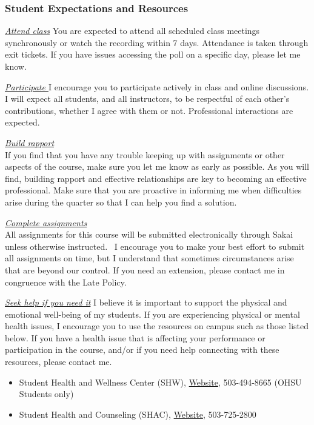 \documentclass[
  letterpaper,
  DIV=11,
  numbers=noendperiod]{scrartcl}
\begin{document}
\subsubsection{Student Expectations and
Resources}\label{student-expectations-and-resources}

\ul{\emph{Attend class}}\textbf{\hfill\break
}You are expected to attend all scheduled class meetings synchronously
or watch the recording within 7 days. Attendance is taken through exit
tickets. If you have issues accessing the poll on a specific day, please
let me know.~

\ul{\emph{Participate\textbf{\hfill\break
}}}I encourage you to participate actively in class and online
discussions. I will expect all students, and all instructors, to be
respectful of each other's contributions, whether I agree with them or
not. Professional interactions are expected.

\ul{\emph{Build rapport}}\\
If you find that you have any trouble keeping up with assignments or
other aspects of the course, make sure you let me know as early as
possible. As you will find, building rapport and effective relationships
are key to becoming an effective professional. Make sure that you are
proactive in informing me when difficulties arise during the quarter so
that I can help you find a solution.

\ul{\emph{Complete assignments}}\\
All assignments for this course will be submitted electronically through
Sakai unless otherwise instructed.~ I encourage you to make your best
effort to submit all assignments on time, but I understand that
sometimes circumstances arise that are beyond our control. If you need
an extension, please contact me in congruence with the Late Policy.

\ul{\emph{Seek help if you need it}}\textbf{\hfill\break
}I believe it is important to support the physical and emotional
well‐being of my students. If you are experiencing physical or mental
health issues, I encourage you to use the resources on campus such as
those listed below. If you have a health issue that is affecting your
performance or participation in the course, and/or if you need help
connecting with these resources, please contact me.

\begin{itemize}
\item
  Student Health and Wellness Center (SHW),
  \href{https://www.ohsu.edu/education/student-health-and-wellness}{Website},
  503-494-8665 (OHSU Students only)
\item
  Student Health and Counseling (SHAC),
  \href{https://www.pdx.edu/health-counseling/}{Website}, 503-725-2800
\end{itemize}
\end{document}
